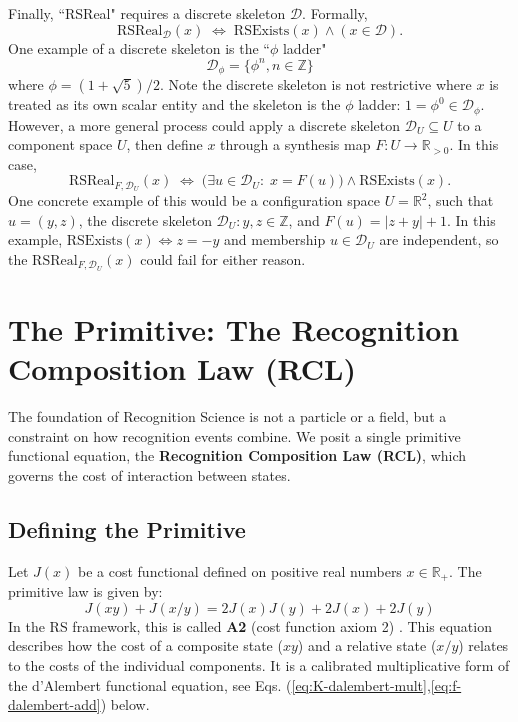 \documentclass[11pt,a4paper]{article}
\newcommand{\RSExists}{\mathrm{RSExists}}
\newcommand{\RSReal}{\mathrm{RSReal}}
\newcommand{\Dset}{\mathcal{D}}
\newcommand{\Rpos}{\mathbb{R}_{>0}}
\begin{document}
Finally, ``RSReal" requires a discrete skeleton $\mathcal{D}$.
Formally, 
\begin{equation}
  \RSReal_{\Dset}(x)
  \;\Longleftrightarrow\;
  \RSExists(x)\land (x\in\Dset).
\end{equation}
One example of a discrete skeleton is the ``$\phi$ ladder"
\begin{equation}
    \mathcal{D}_\phi=\{\phi^n, n\in \mathbb{Z}\}
\end{equation}
where $\phi=(1+\sqrt{5})/2$.
Note the discrete skeleton is not restrictive where $x$ is treated as its own scalar entity and the skeleton is the $\phi$ ladder: $1=\phi^0\in\Dset_\phi$. However, a more general process could apply a discrete skeleton \(\Dset_U\subseteq U\) to a component space \(U\), then define $x$ through a synthesis map \(F:U\to\Rpos\). In this case,
\begin{equation}
  \RSReal_{F,\Dset_U}(x)
  \;\Longleftrightarrow\;
  \Big(\exists u\in\Dset_U:\; x=F(u)\Big)\land \RSExists(x).
\end{equation}
One concrete example of this would be a configuration space $U=\mathbb{R}^2$, such that $u=(y,z)$, the discrete skeleton $\Dset_U:y,z\in \mathbb{Z}$, and $F(u)=|z+y|+1$. In this example, $\RSExists(x)\Leftrightarrow z=-y$ and membership $u\in \Dset_U$ are independent, so the $\RSReal_{F,\Dset_U}(x)$ could fail for either reason.



\section{The Primitive: The Recognition Composition Law (RCL)}

The foundation of Recognition Science is not a particle or a field, but a constraint on how recognition events combine. We posit a single primitive functional equation, the \textbf{Recognition Composition Law (RCL)}, which governs the cost of interaction between states.

\subsection{Defining the Primitive}
Let $J(x)$ be a cost functional defined on positive real numbers $x \in \mathbb{R}_+$. The primitive law is given by:
\begin{equation}
    J(xy) + J(x/y) = 2J(x)J(y) + 2J(x) + 2J(y)
    \label{eq:RCL}
\end{equation}
In the RS framework, this is called \textbf{A2} (cost function axiom 2) \cite{CoherentComparisonLedger}. This equation describes how the cost of a composite state ($xy$) and a relative state ($x/y$) relates to the costs of the individual components. It is a calibrated multiplicative form of the d'Alembert functional equation, see Eqs. (\ref{eq:K-dalembert-mult},\ref{eq:f-dalembert-add}) below.
\end{document}
